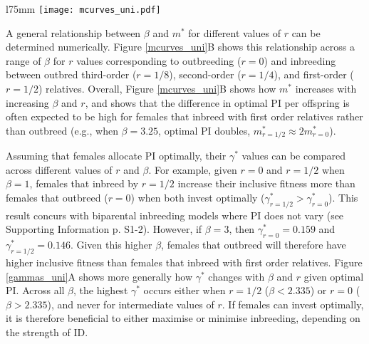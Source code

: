 \documentclass[10pt,letterpaper]{article}
\begin{document}
\begin{wrapfigure}[25]{l}{75mm}
\texttt{[image: mcurves\_uni.pdf]}
\captionsetup{labelformat=empty} %
\caption{} %
\label{mcurves_uni} %
\end{wrapfigure} %
A general relationship between $\beta$ and $m^{*}$ for different values of $r$ can be determined numerically. Figure \ref{mcurves_uni}B shows this relationship across a range of $\beta$ for $r$ values corresponding to outbreeding ($r=0$) and inbreeding between outbred third-order ($r=1/8$), second-order ($r=1/4$), and first-order ($r=1/2$) relatives. Overall, Figure \ref{mcurves_uni}B shows how $m^{*}$ increases with increasing $\beta$ and $r$, and shows that the difference in optimal PI per offspring is often expected to be high for females that inbreed with first order relatives rather than outbreed (e.g., when $\beta=3.25$, optimal PI doubles, $m^{*}_{r=1/2} \approx 2m^{*}_{r=0}$).

Assuming that females allocate PI optimally, their $\gamma^{*}$ values can be compared across different values of $r$ and $\beta$. For example, given $r=0$ and $r=1/2$ when $\beta=1$, females that inbreed by $r=1/2$ increase their inclusive fitness more than females that outbreed ($r=0$) when both invest optimally ($\gamma^{*}_{r=1/2}>\gamma^{*}_{r=0}$). This result concurs with biparental inbreeding models where PI does not vary (see Supporting Information p. S1-2). However, if $\beta=3$, then $\gamma^{*}_{r=0}=0.159$ and $\gamma^{*}_{r=1/2}=0.146$. Given this higher $\beta$, females that outbreed will therefore have higher inclusive fitness than females that inbreed with first order relatives. Figure \ref{gammas_uni}A shows more generally how $\gamma^{*}$ changes with $\beta$ and $r$ given optimal PI. Across all $\beta$, the highest $\gamma^{*}$ occurs either when $r=1/2$ ($\beta < 2.335$) or $r=0$ ($\beta > 2.335$), and never for intermediate values of $r$. If females can invest optimally, it is therefore beneficial to either maximise or minimise inbreeding, depending on the strength of ID.
\end{document}
